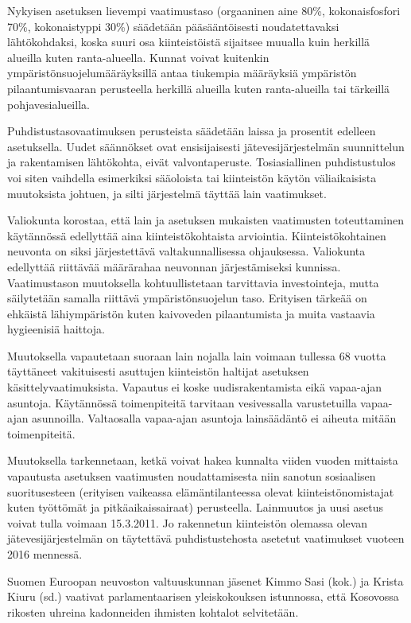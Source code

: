 Nykyisen asetuksen lievempi vaatimustaso (orgaaninen aine 80\%,
kokonaisfosfori 70\%, kokonaistyppi 30\%) säädetään pääsääntöisesti
noudatettavaksi lähtökohdaksi, koska suuri osa kiinteistöistä
sijaitsee muualla kuin herkillä alueilla kuten ranta-alueella. Kunnat
voivat kuitenkin ympäristönsuojelumääräyksillä antaa tiukempia
määräyksiä ympäristön pilaantumisvaaran perusteella herkillä alueilla
kuten ranta-alueilla tai tärkeillä pohjavesialueilla.

Puhdistustasovaatimuksen perusteista säädetään laissa ja prosentit
edelleen asetuksella. Uudet säännökset ovat ensisijaisesti
jätevesijärjestelmän suunnittelun ja rakentamisen lähtökohta, eivät
valvontaperuste. Tosiasiallinen puhdistustulos voi siten vaihdella
esimerkiksi sääoloista tai kiinteistön käytön väliaikaisista
muutoksista johtuen, ja silti järjestelmä täyttää lain vaatimukset.

Valiokunta korostaa, että lain ja asetuksen mukaisten vaatimusten
toteuttaminen käytännössä edellyttää aina kiinteistökohtaista
arviointia. Kiinteistökohtainen neuvonta on siksi järjestettävä
valtakunnallisessa ohjauksessa. Valiokunta edellyttää riittävää
määrärahaa neuvonnan järjestämiseksi kunnissa.  Vaatimustason
muutoksella kohtuullistetaan tarvittavia investointeja, mutta
säilytetään samalla riittävä ympäristönsuojelun taso. Erityisen
tärkeää on ehkäistä lähiympäristön kuten kaivoveden pilaantumista ja
muita vastaavia hygieenisiä haittoja.

Muutoksella vapautetaan suoraan lain nojalla lain voimaan tullessa 68
vuotta täyttäneet vakituisesti asuttujen kiinteistön haltijat
asetuksen käsittelyvaatimuksista. Vapautus ei koske uudisrakentamista
eikä vapaa-ajan asuntoja. Käytännössä toimenpiteitä tarvitaan
vesivessalla varustetuilla vapaa-ajan asunnoilla.  Valtaosalla
vapaa-ajan asuntoja lainsäädäntö ei aiheuta mitään toimenpiteitä.

Muutoksella tarkennetaan, ketkä voivat hakea kunnalta viiden vuoden
mittaista vapautusta asetuksen vaatimusten noudattamisesta niin
sanotun sosiaalisen suoritusesteen (erityisen vaikeassa
elämäntilanteessa olevat kiinteistönomistajat kuten työttömät ja
pitkäaikaissairaat) perusteella.  Lainmuutos ja uusi asetus voivat
tulla voimaan 15.3.2011. Jo rakennetun kiinteistön olemassa olevan
jätevesijärjestelmän on täytettävä puhdistustehosta asetetut
vaatimukset vuoteen 2016 mennessä.

Suomen Euroopan neuvoston valtuuskunnan jäsenet Kimmo Sasi (kok.) ja
Krista Kiuru (sd.) vaativat parlamentaarisen yleiskokouksen
istunnossa, että Kosovossa rikosten uhreina kadonneiden ihmisten
kohtalot selvitetään.

